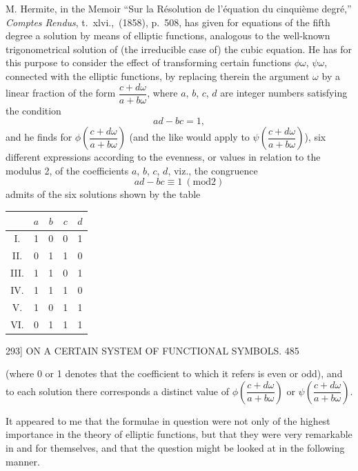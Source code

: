 \documentclass[11pt]{article}
\providecommand{\modd}{\mathrm{mod}}
\begin{document}
\medskip

M. Hermite, in the Memoir ``Sur la R\'esolution de l'\'equation du cinqui\`eme
degr\'e,'' \textit{Comptes Rendus}, t.\ xlvi.,\ (1858), p.~508, has given for equations of the fifth
degree a solution by means of elliptic functions, analogous to the well-known
trigonometrical solution of (the irreducible case of) the cubic equation. He has for
this purpose to consider the effect of transforming certain functions $\phi\omega$, $\psi\omega$, connected
with the elliptic functions, by replacing therein the argument $\omega$ by a linear fraction
of the form $\dfrac{c+d\omega}{a+b\omega}$, where $a$, $b$, $c$, $d$ are integer numbers satisfying the condition
\[ ad-bc=1, \]
and he finds for $\phi\!\left(\dfrac{c+d\omega}{a+b\omega}\right)$ (and the like would apply to $\psi\!\left(\dfrac{c+d\omega}{a+b\omega}\right)$), six different
expressions according to the evenness, or values in relation to the modulus 2, of the
coefficients $a$, $b$, $c$, $d$, viz., the congruence
\[ ad-bc\equiv 1\ (\modd 2) \]
admits of the six solutions shown by the table
\begin{center}
\begin{tabular}{c|cccc}
 & $a$ & $b$ & $c$ & $d$ \\ \hline
I.   & 1 & 0 & 0 & 1 \\
II.  & 0 & 1 & 1 & 0 \\
III. & 1 & 1 & 0 & 1 \\
IV.  & 1 & 1 & 1 & 0 \\
V.   & 1 & 0 & 1 & 1 \\
VI.  & 0 & 1 & 1 & 1 \\
\end{tabular}
\end{center}

\newpage
\begin{center}
\textsc{293]} \hfill ON A CERTAIN SYSTEM OF FUNCTIONAL SYMBOLS. \hfill 485
\end{center}

(where 0 or 1 denotes that the coefficient to which it refers is even or odd), and
to each solution there corresponds a distinct value of $\phi\!\left(\dfrac{c+d\omega}{a+b\omega}\right)$ or $\psi\!\left(\dfrac{c+d\omega}{a+b\omega}\right)$.

It appeared to me that the formulae in question were not only of the highest
importance in the theory of elliptic functions, but that they were very remarkable in
and for themselves, and that the question might be looked at in the following
manner.
\end{document}
